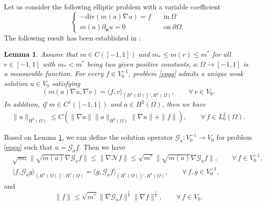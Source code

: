 \documentclass[11pt,reqno]{amsart}
\newtheorem{lemma}{\textbf{Lemma}}[section]
\def\l{\langle}
\def\r{\rangle}
\def\n{{\bm{n}}}
\def\div{\mathrm{div}}
\begin{document}
Let us consider the following elliptic problem with a variable coefficient
%
\begin{equation}\label{epgq}
\begin{cases}
-\div(m(a) \nabla u) = f \quad & \text{in}\ \Omega \\
m(a) \partial_\n u = 0 \quad & \text{on} \ \partial\Omega.
\end{cases}
\end{equation}
%
The following result has been established in \cite{CGGG}:
%
\begin{lemma}\label{lem-mo}
Assume that $m\in C([-1,1])$ and
$m_{*} \leq m(r)\leq m^*$ for all $r \in [-1,1]$ with $m_{*}<m^*$ being two given positive constants, $a: \Omega \to [-1,1]$ is a measurable function.
For every $f\in V_0^{-1}$, problem \eqref{epgq} admits a unique weak solution $u\in V_0$ satisfying
%
\begin{equation}\label{def G_q}
( m(a) \nabla u ,\nabla v ) = \l f, v \r_{(H^1(\Omega))',H^1(\Omega)},
\qquad \forall \, v \in  V_{0}.
\end{equation}
%
In addition, if $m\in C^1([-1,1])$ and $a\in H^2(\Omega)$, then we have
%
\begin{align}
\|u\|_{H^2(\Omega)}\leq C(\|\nabla a\|\|a\|_{H^2(\Omega)}\|\nabla u\| +\|f\|),\qquad
\forall\, f\in L^2_0(\Omega).
\label{es-Ga-H2}
\end{align}
\end{lemma}
%
Based on Lemma \ref{lem-mo}, we can define the solution operator $\mathcal{G}_a:  V^{-1}_{0} \to  V_{0}$ for problem \eqref{epgq} such that $u = \mathcal{G}_a f$. Then we have
%
\begin{align}
& \sqrt{m_*}\|\sqrt{m(a)}\nabla \mathcal{G}_a f\|\leq \|\nabla \mathcal{N}f\|\leq \sqrt{m^*}\|\sqrt{m(a)}\nabla \mathcal{G}_a f\|,\qquad \forall\, f\in V_0^{-1},
\label{equiv-norm-h-1}
\\
&
\l f, \mathcal{G}_a  g \r_{(H^1(\Omega))',H^1(\Omega)}
= \l g, \mathcal{G}_a f \r_{(H^1(\Omega))',H^1(\Omega)}, \qquad \forall \, f,g \in  V^{-1}_{0},
\label{AUTO}
\end{align}
%
and
%
\begin{equation}
\label{inter-2}
\| f\|\leq \sqrt{m^*}
\| \nabla \mathcal{G}_a f \|^\frac12 \| \nabla f \|^\frac12,
\qquad \forall \, f \in  V_{0}.
\end{equation}
\end{document}
